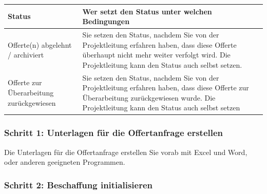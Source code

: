 \vspace{\baselineskip}

\begin{tabular}{|p{5cm}|p{9.5cm}|}    %
\hline
\textbf{Status} & \textbf{Wer setzt den Status unter welchen Bedingungen} \\
\hline
Offerte(n) abgelehnt / archiviert & Sie setzen den Status, nachdem Sie von der Projektleitung erfahren haben, dass diese Offerte überhaupt nicht mehr weiter verfolgt wird. Die Projektleitung kann den Status auch selbst setzen. \\
\hline
Offerte zur Überarbeitung zurückgewiesen & Sie setzen den Status, nachdem Sie von der Projektleitung erfahren haben, dass diese Offerte zur Überarbeitung zurückgewiesen wurde. Die Projektleitung kann den Status auch selbst setzen \\
\hline
\end{tabular}

\subsubsection{Schritt 1: Unterlagen für die Offertanfrage erstellen}

Die Unterlagen für die Offertanfrage erstellen Sie vorab mit Excel und Word, oder anderen geeigneten Programmen.

\subsubsection{Schritt 2: Beschaffung initialisieren}

